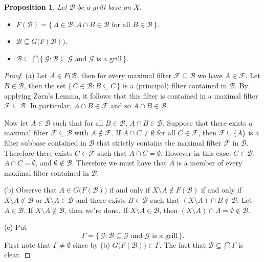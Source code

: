 \documentclass[12pt]{article}
\theoremstyle{plain}
\newtheorem{prop}[thm]{Proposition}
\theoremstyle{definition}
\newcommand{\calB}{\mathcal{B}}
\newcommand{\calF}{\mathcal{F}}
\newcommand{\calG}{\mathcal{G}}
\begin{document}
\begin{prop}
  Let $\calB$ be a grill base on $X$.
  \begin{itemize}
    \item[(a)] $F(\calB) = \{\, A \in \calB : \mbox{$A \cap B \in \calB$ for all $B \in \calB$} \,\}$.

    \item[(b)] $\calB \subseteq G\bigl(F(\calB)\bigr)$.

    \item[(c)] $\calB  \subseteq \bigcap\{\, \calG : \mbox{$\calB \subseteq \calG$ and $\calG$ is a grill} \,\}$.
  \end{itemize}
\end{prop}
\begin{proof}
  (a) 
  Let $A \in F(\calB$, then for every maximal filter $\calF \subseteq \calB$ we have $A \in \calF$. 
  Let $B \in \calB$, then the set $\{\, C \in \calB : B \subseteq C \,\}$ is a (principal) filter contained in $\calB$.
  By applying Zorn's Lemma, it follows that this filter is contained in a maximal filter $\calF \subseteq \calB$.
  In particular, $A \cap B \in \calF$ and so $A \cap B \in \calB$.

  Now let $A \in \calB$ such that for all $B \in \calB$, $A \cap B \in \calB$.
  Suppose that there exists a maximal filter $\calF \subseteq \calB$ with $A \not\in \calF$. 
  If $A \cap C \ne \emptyset$ for all $C \in \calF$, then $\calF \cup \{A\}$ is a filter subbase contained in $\calB$ that strictly contains the maximal filter $\calF$ in $\calB$.
  Therefore there exists $C \in \calF$ such that $A \cap C = \emptyset$.
  However in this case, $C \in \calB$, $A \cap C = \emptyset$, and $\emptyset \not\in \calB$.
  Therefore we must have that $A$ is a member of every maximal filter contained in $\calB$.

  (b)
  Observe that $A \in G\bigl(F(\calB)\bigr)$ if and only if $X \setminus A \not\in F(\calB)$ if and only if $X \setminus A \not\in \calB$ or $X \setminus A \in \calB$ and there exists $B \in \calB$ such that $(X \setminus A) \cap B \not\in \calB$.
  Let $A \in \calB$. 
  If $X \setminus A \not\in \calB$, then we're done.
  If $X \setminus A \in \calB$, then $(X \setminus A) \cap A = \emptyset \not\in \calB$.

  (c)
  Put
  \[
    \Gamma = \{\, \calG : \mbox{$\calB \subseteq \calG$ and $\calG$ is a grill} \,\}.
  \]
  First note that $\Gamma \ne \emptyset$ since by (b) $G\bigl(F(\calB)\bigr) \in \Gamma$.
  The fact that $\calB \subseteq \bigcap\Gamma$ is clear.
\end{proof}
\end{document}
